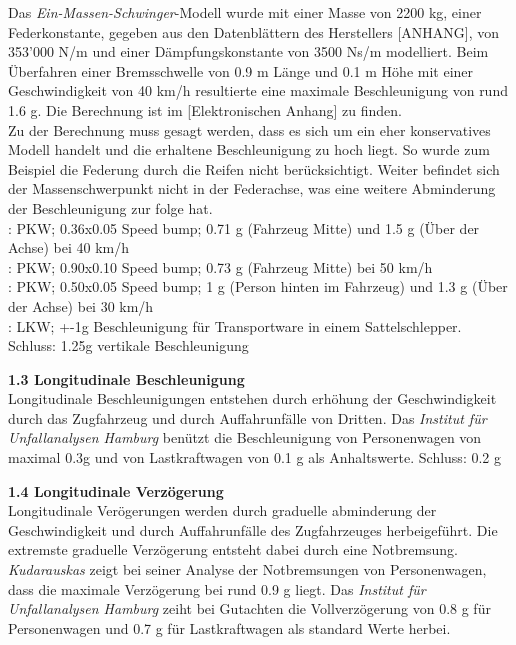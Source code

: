 \begin{description}
  Das \emph{Ein-Massen-Schwinger}-Modell wurde mit einer Masse von 2200 kg, einer Federkonstante, gegeben aus den Datenblättern des Herstellers [ANHANG], von 353'000 N/m und einer Dämpfungskonstante von 3500 Ns/m modelliert. Beim Überfahren einer Bremsschwelle von 0.9 m Länge und 0.1 m Höhe mit einer Geschwindigkeit von 40 km/h resultierte eine maximale Beschleunigung von rund 1.6 g. Die Berechnung ist im [Elektronischen Anhang] zu finden.\\
  Zu der Berechnung muss gesagt werden, dass es sich um ein eher konservatives Modell handelt und die erhaltene Beschleunigung zu hoch liegt. So wurde zum Beispiel die Federung durch die Reifen nicht berücksichtigt. Weiter befindet sich der Massenschwerpunkt nicht in der Federachse, was eine weitere Abminderung der Beschleunigung zur folge hat.\\



  \cite{Beschl.1}: PKW; 0.36x0.05 Speed bump; 0.71 g (Fahrzeug Mitte) und 1.5 g (Über der Achse) bei 40 km/h\\
  \cite{Beschl.2}: PKW; 0.90x0.10 Speed bump; 0.73 g (Fahrzeug Mitte) bei 50 km/h\\
  \cite{Beschl.3}: PKW; 0.50x0.05 Speed bump; 1 g (Person hinten im Fahrzeug) und 1.3 g (Über der Achse) bei 30 km/h\\
  \cite{Beschl.4}: LKW; +-1g Beschleunigung für Transportware in einem Sattelschlepper.\\

  Schluss: 1.25g vertikale Beschleunigung

  \item \textbf{1.3 Longitudinale Beschleunigung}\\
  Longitudinale Beschleunigungen entstehen durch erhöhung der Geschwindigkeit durch das Zugfahrzeug und durch Auffahrunfälle von Dritten. Das \emph{Institut für Unfallanalysen Hamburg} benützt die Beschleunigung von Personenwagen von maximal 0.3g und von Lastkraftwagen von 0.1 g als Anhaltswerte. \cite{Verz.3}
  Schluss: 0.2 g

  \item \textbf{1.4 Longitudinale Verzögerung}\\
  Longitudinale Verögerungen werden durch graduelle abminderung der Geschwindigkeit und durch Auffahrunfälle des Zugfahrzeuges herbeigeführt. Die extremste graduelle Verzögerung entsteht dabei durch eine Notbremsung.\\
  \emph{Kudarauskas} zeigt bei seiner Analyse der Notbremsungen von Personenwagen, dass die maximale Verzögerung bei rund 0.9 g liegt. \cite{Verz.1} Das \emph{Institut für Unfallanalysen Hamburg} zeiht bei Gutachten die Vollverzögerung von 0.8 g für Personenwagen und 0.7 g für Lastkraftwagen als standard Werte herbei. \cite{Verz.2}\\


\end{description}
